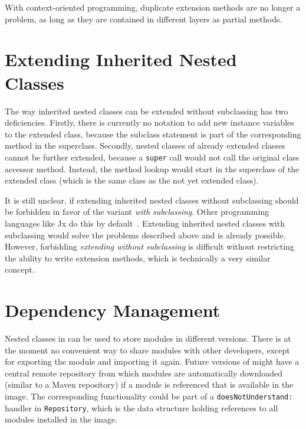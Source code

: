 With context-oriented programming, duplicate extension methods are no longer a problem, as long as they are contained in different layers as partial methods.


\section{Extending Inherited Nested Classes}
The way inherited nested classes can be extended without subclassing has two deficiencies. Firstly, there is currently no notation to add new instance variables to the extended class, because the subclass statement is part of the corresponding method in the superclass. Secondly, nested classes of already extended classes cannot be further extended, because a \texttt{super} call would not call the original class accessor method. Instead, the method lookup would start in the superclass of the extended class (which is the same class as the not yet extended class).

It is still unclear, if extending inherited nested classes without subclassing should be forbidden in favor of the variant \emph{with subclassing}. Other programming languages like Jx do this by default~\cite{Nystrom:2004:SEV:1028976.1028986}. Extending inherited nested classes with subclassing would solve the problems described above and is already possible. However, forbidding \emph{extending without subclassing} is difficult without restricting the ability to write extension methods, which is technically a very similar concept.

\section{Dependency Management}
Nested classes in \msname can be used to store modules in different versions. There is at the moment no convenient way to share modules with other developers, except for exporting the module and importing it again. Future versions of \msname might have a central remote repository from which modules are automatically downloaded (similar to a Maven repository) if a module is referenced that is available in the image. The corresponding functionality could be part of a \texttt{doesNotUnderstand:} handler in \texttt{Repository}, which is the data structure holding references to all modules installed in the image.

